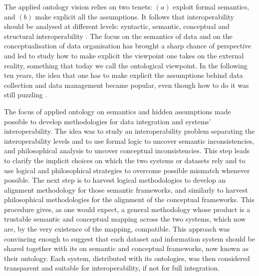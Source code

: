 \documentclass[ao]{iosart2x}
\begin{document}
The applied ontology vision relies on two tenets: $(a)$ exploit formal semantics, and $(b)$ make explicit all the assumptions. It follows that interoperability should be analysed at different levels: syntactic, semantic, conceptual and structural interoperability \citep{guarinoOntologicalLevel1998}. The focus on the semantics of data and on the conceptualisation of data organisation has brought a sharp chance of perspective and led to study how to make explicit the viewpoint one takes on the external reality, something that today we call the ontological viewpoint. In the following ten years, the idea that one has to make explicit the assumptions behind data collection and data management became popular, even though how to do it was still puzzling \citep{oukselSemanticInteroperability1999}. 

\medskip
The focus of applied ontology on semantics and hidden assumptions made possible to develop methodologies for data integration and systems' interoperability. The idea was to study an interoperability problem separating the interoperability levels and to use formal logic to uncover semantic inconsistencies, and philosophical analysis to uncover conceptual inconsistencies. 
This step leads to clarify the implicit choices on which the two systems or datasets rely and to use logical and philosophical strategies to overcome possible mismatch whenever possible. The next step is to harvest logical methodologies to develop an alignment methodology for those semantic frameworks, and similarly to harvest philosophical methodologies for the alignment of the conceptual frameworks. 
This procedure gives, as one would expect, a general methodology whose product is a trustable semantic and conceptual mapping across the two systems, which now are, by the very existence of the mapping, compatible. 
This approach was convincing enough to suggest that each dataset and information system should be shared together with its on semantic and conceptual frameworks, now known as their ontology. Each system, distributed with its ontologies, was then considered transparent and suitable for interoperability, if not for full integration. 
\end{document}
